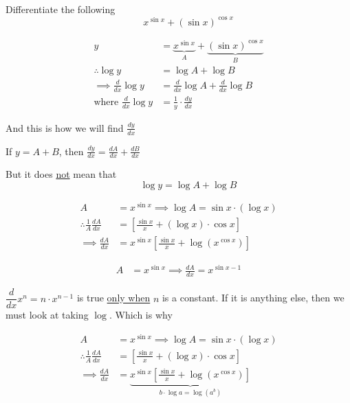 \documentclass[14pt,fleqn]{extarticle}
\newcommand\fa{x^{\sin x}}
\newcommand\sa{\left(\sin x \right)^{\cos x}}
\begin{document}
 

Differentiate the following 
\[ \qquad x^{\sin x} + \left(\sin x \right)^{\cos x} \] 

\newcard 

\begin{align}
	y &= \underbrace{\fa}_A + \underbrace{\sa}_B \\
	\therefore \log y &= \log A + \log B  \\
	\implies \frac{d}{dx}\log y &= \frac{d}{dx}\log A + \frac{d}{dx}\log B \\
	\text{where } \frac{d}{dx}\log y &= \frac{1}{y}\cdot \frac{dy}{dx}
\end{align}

And this is how we will find $\frac{dy}{dx}$ 

\newcard 

If $y = A + B$, then $\frac{dy}{dx} = \frac{dA}{dx} + \frac{dB}{dx}$ \newline 

But it does \underline{not} mean that 
\[ \qquad \log y = \log A + \log B \] 

\newcard 

\begin{align}
	A &= \fa \implies \log A = \sin x\cdot \left(\log x \right) \\
	\therefore \frac{1}{A} \frac{dA}{dx} &= \left[\frac{\sin x}{x} + \left(\log x \right)\cdot \cos x  \right] \\
	\implies \frac{dA}{dx} &= \fa \left[\frac{\sin x}{x} + \log \left(x^{\cos x} \right)\right]
\end{align}

\newcard 

\begin{align}
	A &= \fa \implies \frac{dA}{dx} = x^{ \sin x - 1} 
\end{align}

\newcard 

$\dfrac{d}{dx}x^n = n\cdot x^{n-1}$ is true \underline{only when} $n$ is a constant. If it is anything else, then we must look at taking $\log$. Which is why 

\begin{align}
	A &= \fa \implies \log A = \sin x\cdot \left(\log x \right) \\
	\therefore \frac{1}{A} \frac{dA}{dx} &= \left[\frac{\sin x}{x} + \left(\log x \right)\cdot \cos x  \right] \\
	\implies \frac{dA}{dx} &= \underbrace{\fa \left[\frac{\sin x}{x} + \log \left(x^{\cos x} \right)\right]}_{b\cdot \log a = \log \left(a^b \right)}
	\end{align} 
	
\end{document}

